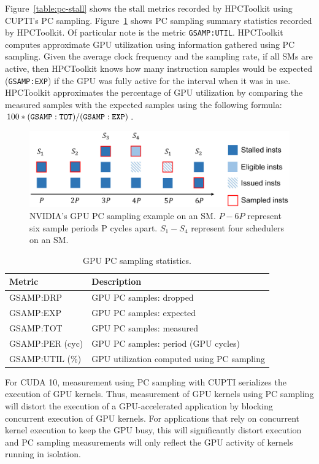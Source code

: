 Figure~\ref{table:pc-stall} shows the stall metrics recorded by HPCToolkit using CUPTI's PC sampling. Figure~\ref{table:gsamp} shows PC sampling summary statistics recorded by HPCToolkit. Of particular note is the metric \verb|GSAMP:UTIL|. HPCToolkit computes approximate GPU utilization using information gathered using PC sampling. Given the average clock frequency and the sampling rate, if all SMs are active, then HPCToolkit knows how many instruction samples would be expected ({\tt GSAMP:EXP}) if the GPU was fully active for the interval when it was in use. HPCToolkit approximates the percentage of GPU utilization by comparing the measured samples with the expected samples using the following formula: $100 * {\tt (GSAMP:TOT)/ (GSAMP:EXP)}$.


\begin{figure}[t]
\includegraphics[width=\textwidth]{fig/mental-model.pdf}
\caption{NVIDIA's GPU PC sampling example on an SM. $P-6P$ represent
six sample periods P cycles apart. $S_{1}-S_{4}$ represent four schedulers on an SM.}
\label{fig:pc sampling}
\vspace{-2ex}
\end{figure}

\begin{table}[t]
\centering
\begin{tabular}{|l|l|}\hline
Metric & Description\\\hline\hline
 GSAMP:DRP  &  GPU PC samples: dropped  \\\hline
  GSAMP:EXP  &  GPU PC samples: expected  \\\hline
  GSAMP:TOT  &  GPU PC samples: measured  \\\hline
  GSAMP:PER (cyc)  &  GPU PC samples: period (GPU cycles)  \\\hline
  GSAMP:UTIL (\%) & GPU utilization computed using PC sampling\\\hline
\end{tabular}
\caption{GPU PC sampling statistics.}
\label{table:gsamp}
\end{table}



For CUDA 10, measurement using PC sampling with CUPTI serializes the execution of GPU kernels. Thus, measurement of GPU kernels using PC sampling will distort the execution of a GPU-accelerated application by blocking concurrent execution of GPU kernels. For applications that rely on concurrent kernel execution to keep the GPU busy, this will significantly distort execution and PC sampling measurements will only reflect the GPU activity of kernels running in isolation.




